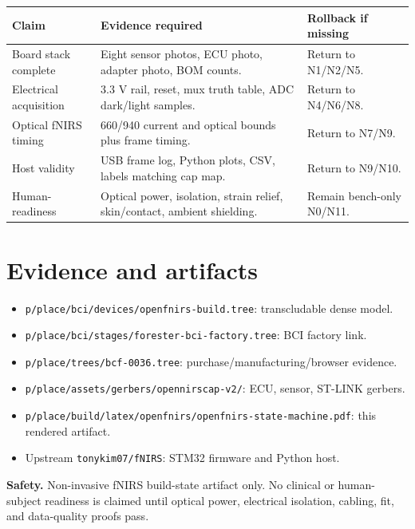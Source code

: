 \documentclass[10pt]{article}
\begin{document}
\begin{center}\scriptsize
\begin{tabular}{|L{1.25in}|L{2.2in}|L{2.25in}|}
\hline
\textbf{Claim} & \textbf{Evidence required} & \textbf{Rollback if missing} \\
\hline
Board stack complete & Eight sensor photos, ECU photo, adapter photo, BOM counts. & Return to N1/N2/N5. \\
\hline
Electrical acquisition & 3.3 V rail, reset, mux truth table, ADC dark/light samples. & Return to N4/N6/N8. \\
\hline
Optical fNIRS timing & 660/940 current and optical bounds plus frame timing. & Return to N7/N9. \\
\hline
Host validity & USB frame log, Python plots, CSV, labels matching cap map. & Return to N9/N10. \\
\hline
Human-readiness & Optical power, isolation, strain relief, skin/contact, ambient shielding. & Remain bench-only N0/N11. \\
\hline
\end{tabular}
\end{center}

\section{Evidence and artifacts}

\begin{itemize}
\item \texttt{p/place/bci/devices/openfnirs-build.tree}: transcludable dense model.
\item \texttt{p/place/bci/stages/forester-bci-factory.tree}: BCI factory link.
\item \texttt{p/place/trees/bcf-0036.tree}: purchase/manufacturing/browser evidence.
\item \texttt{p/place/assets/gerbers/opennirscap-v2/}: ECU, sensor, ST-LINK gerbers.
\item \texttt{p/place/build/latex/openfnirs/openfnirs-state-machine.pdf}: this rendered artifact.
\item Upstream \texttt{tonykim07/fNIRS}: STM32 firmware and Python host.
\end{itemize}

\textbf{Safety.} Non-invasive fNIRS build-state artifact only. No clinical or
human-subject readiness is claimed until optical power, electrical isolation,
cabling, fit, and data-quality proofs pass.
\end{document}
